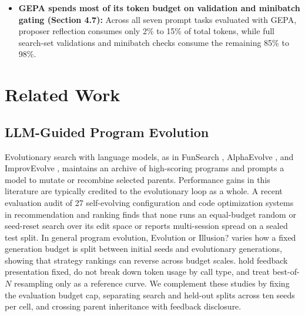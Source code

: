 \documentclass[10pt]{article}
\begin{document}
\begin{itemize}
  categories are retained in the parent and filtered from future failure
  lists, \texttt{first-k} disclosure shifts across 46\% to 86\% of the
  search set, catching up by round 4 and finishing at the same level.
  Conversely, random mixed minibatches reduce parent-inheritance
  accuracy by spending feedback slots on passing examples.
\item
  \textbf{GEPA spends most of its token budget on validation and
  minibatch gating (Section 4.7):} Across all seven prompt tasks
  evaluated with GEPA, proposer reflection consumes only 2\% to 15\% of
  total tokens, while full search-set validations and minibatch checks
  consume the remaining 85\% to 98\%.
\end{itemize}

\hypertarget{related-work}{%
\section{Related Work}\label{related-work}}

\hypertarget{llm-guided-program-evolution}{%
\subsection{LLM-Guided Program
Evolution}\label{llm-guided-program-evolution}}

Evolutionary search with language models, as in FunSearch
\citep{romeraparedes2023mathematical}, AlphaEvolve
\citep{alexander2025alphaevolve}, and ImprovEvolve
\citep{kravatskiy2026improvevolve}, maintains an archive of high-scoring
programs and prompts a model to mutate or recombine selected parents.
Performance gains in this literature are typically credited to the
evolutionary loop as a whole. A recent evaluation audit of 27
self-evolving configuration and code optimization systems in
recommendation and ranking \citep{yang2026selfevolvingrecsys} finds that
none runs an equal-budget random or seed-reset search over its edit
space or reports multi-session spread on a sealed test split. In general
program evolution, Evolution or Illusion? \citep{oved2026evolution}
varies how a fixed generation budget is split between initial seeds and
evolutionary generations, showing that strategy rankings can reverse
across budget scales. \citet{oved2026evolution} hold feedback
presentation fixed, do not break down token usage by call type, and
treat best-of-\(N\) resampling only as a reference curve. We complement
these studies by fixing the evaluation budget cap, separating search and
held-out splits across ten seeds per cell, and crossing parent
inheritance with feedback disclosure.
\end{document}
